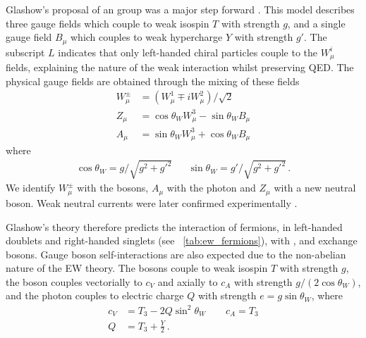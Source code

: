 Glashow's proposal of an \EWgroup group was a major step forward \cite{Glashow:1961}. 
This model describes three gauge fields  
which couple to weak isospin $T$ with strength $g$, and a single gauge field $B_{\mu}$ 
which couples to weak hypercharge $Y$ with strength $g'$. The subscript $L$ indicates 
that only left-handed chiral particles couple to the $W^i_{\mu}$ fields, explaining the 
\VminusA nature of the weak interaction whilst preserving \ac{QED}. The physical gauge 
fields are obtained through the mixing of these fields
\begin{align}
	W^{\pm}_{\mu} &= (W^1_{\mu} \mp i W^2_{\mu}) / \sqrt{2} \label{eq:Wfield} \\
	Z_{\mu} &= \cos\theta_W W^3_{\mu} - \sin\theta_W B_{\mu} \label{eq:Zfield} \\
	A_{\mu} &= \sin\theta_W W^3_{\mu} + \cos\theta_W B_{\mu} \label{eq:Afield}
\end{align}
where
\begin{align}
	\cos\theta_W = g/\sqrt{g^2 + g'^2} && \sin\theta_W = g'/\sqrt{g^2 + g'^2} \,. \label{eq:weak_mixing}
\end{align}
We identify $W^{\pm}_{\mu}$ with the \PWpm bosons, $A_{\mu}$ with the photon 
and $Z_{\mu}$ with a new neutral \PZ boson. Weak neutral currents were later confirmed 
experimentally \cite{Gargamelle:1973}. 

Glashow's \EWgroup theory therefore predicts the interaction of fermions, in left-handed 
 doublets and right-handed  singlets (see 
\Table~\ref{tab:ew_fermions}), with \PWpm, \PZ and \Pphoton 
exchange bosons. Gauge boson self-interactions are also expected due to the non-abelian 
nature of the \ac{EW} theory. The \PWpm bosons couple to weak isospin $T$ with strength 
$g$, the \PZ boson couples vectorially to $c_V$ and axially to $c_A$ with strength 
$g/(2\cos\theta_W)$, and the photon couples to electric charge $Q$ with strength 
$e = g\sin\theta_W$, where
\begin{align}
	c_V &= T_3 - 2 Q \sin^2\theta_W \quad\quad c_A = T_3 \\
	Q   &= T_3 + \frac{Y}{2} \,.
\end{align}

